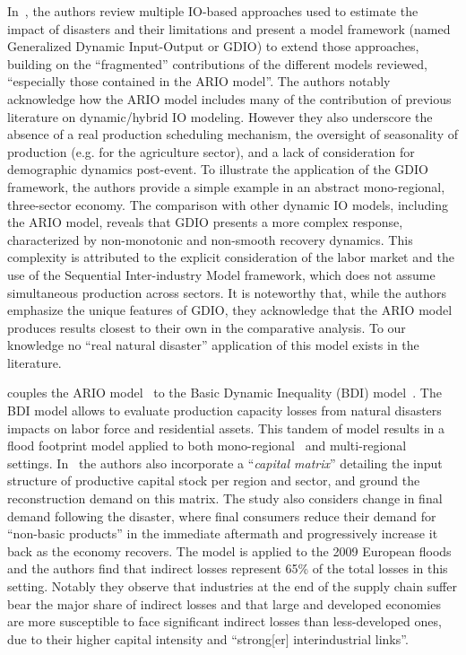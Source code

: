 In~\textcite{avelino-2019-chall-estim}, the authors review multiple
IO-based approaches used to estimate the impact of disasters and their
limitations and present a model framework (named Generalized Dynamic
Input-Output or GDIO) to extend those approaches, building on the ``fragmented''
contributions of the different models reviewed, ``especially those contained in
the ARIO model''. The authors notably acknowledge how the ARIO model includes many of the
contribution of previous literature on dynamic/hybrid IO modeling.
However they also underscore the absence of a real production scheduling
mechanism, the oversight of seasonality of
production \parencite{avelino-2017-disag-input}
(e.g. for the agriculture sector), and a lack of consideration for demographic
dynamics post-event. To illustrate the application of the GDIO framework, the
authors provide a
simple example in an abstract mono-regional, three-sector economy. The
comparison with other dynamic IO models, including the ARIO model, reveals that
GDIO presents a more complex response, characterized by non-monotonic and
non-smooth recovery dynamics. This complexity is attributed to the explicit consideration
of the labor market and the use of the Sequential Inter-industry Model
framework, which does not assume simultaneous production across sectors.
It is noteworthy that, while the authors emphasize the unique features of GDIO,
they acknowledge that the ARIO model produces results closest to their own in
the comparative analysis.  To our knowledge no ``real natural disaster''
application of this model exists in the literature.

\Textcite{mendoza-tinoco-2020-flood-footp-asses, mendoza-tinoco-2017-flood-footp} couples the ARIO model~\parencite[version
from][]{hallegatte-2008-adapt-region} to the
Basic Dynamic Inequality (BDI)
model~\parencite{li-2013-model-imbal}. The BDI model allows to
evaluate production capacity losses from natural disasters impacts on labor force and
residential assets. This tandem of model results in a flood footprint model
applied to both mono-regional~\textcite{mendoza-tinoco-2017-flood-footp} and
multi-regional~\textcite{mendoza-tinoco-2020-flood-footp-asses} settings.
In~\textcite{mendoza-tinoco-2020-flood-footp-asses} the authors also incorporate a
``\emph{capital matrix}'' detailing the input structure of productive
capital stock per region and sector, and ground the reconstruction demand on
this matrix. The study also considers change in final demand following the disaster,
where final consumers reduce their demand for ``non-basic products'' in the
immediate aftermath and progressively increase it back as the economy recovers.
The model is applied to the 2009 European floods and the authors find
that indirect losses represent 65\% of the total losses in this setting. Notably they
observe that industries at the end of the supply chain suffer bear the major
share of indirect losses and that large and developed economies are more susceptible
to face significant indirect losses than less-developed ones, due to their higher
capital intensity and ``strong[er] interindustrial links''.

